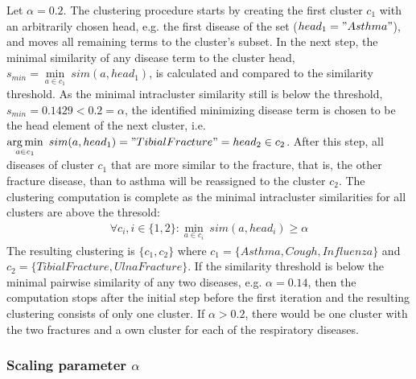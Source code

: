 \begin{exmp}
Let $\alpha=0.2$. The clustering procedure starts by creating the first cluster $c_1$ with an arbitrarily chosen head, e.g. the first disease of the set 
($head_1="Asthma"$), and moves all remaining terms to the cluster's subset. In the next step, the minimal similarity of any disease term to the cluster head, 
$s_{min}=\min\limits_{a \in c_1}~sim(a, head_1)$, is calculated and compared to the similarity threshold. As the minimal intracluster similarity still is below
the threshold, $s_{min}=0.1429 < 0.2=\alpha$, the identified minimizing disease term is chosen to be the head element of the next cluster, i.e. 
$\operatorname*{arg\,min}\limits_{a \in c_1}~sim(a, head_1)="Tibial Fracture"=head_2 \in c_2$. After this step, all diseases of cluster $c_1$ that are more similar to the
fracture, that is, the other fracture disease, than to asthma will be reassigned to the cluster $c_2$. The clustering computation is complete as the minimal 
intracluster similarities for all clusters are above the thresold: 
\begin{align*}
    \forall c_i, i \in \{1,2\}: \min\limits_{a \in c_i}~sim(a, head_i) \geq \alpha
\end{align*}
The resulting clustering is $\{c_1, c_2\}$ where $c_1=\{Asthma,Cough,Influenza\}$ and $c_2=\{Tibial Fracture, Ulna Fracture\}$. If the similarity threshold is
below the minimal pairwise similarity of any two diseases, e.g. $\alpha=0.14$, then the computation stops after the initial step before the first iteration
and the resulting clustering consists of only one cluster. If $\alpha > 0.2$, there would be one cluster with the two fractures and a own cluster for each of 
the respiratory diseases.

\end{exmp}



\subsubsection{Scaling parameter $\alpha$}
\label{sec:impl_clust_alpha}

